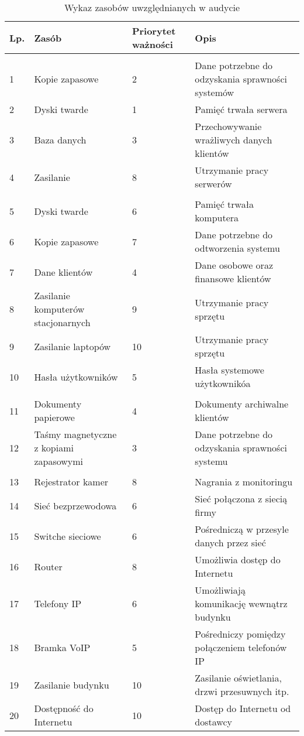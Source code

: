 \begin{longtable}[!ht]{|p{0.5cm}|m{4cm}|m{2cm}|m{6cm}|}
	\caption{Wykaz zasobów uwzględnianych w audycie}
	\label{tab:spis_zasobow}\\
	\hline	
	\rowcolor{lightgray}\textbf{Lp.} & \textbf{Zasób} & \textbf{Priorytet ważności} & \textbf{Opis} \\ \hline
	\rowcolor{lightgray}\multicolumn{4}{|c|}{Serwery:} \\ \hline
	1 & Kopie zapasowe & 2 & Dane potrzebne do odzyskania \linebreak sprawności systemów \\ \hline
	2 & Dyski twarde & 1 & Pamięć trwała serwera \\ \hline
	3 & Baza danych & 3 & Przechowywanie wrażliwych danych klientów \\ \hline
	4 & Zasilanie & 8 & Utrzymanie pracy serwerów \\ \hline
	\rowcolor{lightgray}\multicolumn{4}{|c|}{Komputery pracowników:} \\ \hline	
	5 & Dyski twarde & 6 & Pamięć trwała komputera \\ \hline
	6 & Kopie zapasowe & 7 & Dane potrzebne do odtworzenia \linebreak systemu \\ \hline
	7 & Dane klientów & 4 & Dane osobowe oraz finansowe klientów \\ \hline
	8 & Zasilanie komputerów stacjonarnych & 9 & Utrzymanie pracy sprzętu \\ \hline
	9 & Zasilanie laptopów & 10 &  Utrzymanie pracy sprzętu \\ \hline
	10 & Hasła użytkowników & 5 & Hasła systemowe użytkownikóa \\ \hline
	\rowcolor{lightgray}\multicolumn{4}{|c|}{Archiwum:} \\ \hline
	11 & Dokumenty papierowe & 4 & Dokumenty archiwalne klientów \\	\hline
	12 & Taśmy magnetyczne z kopiami zapasowymi & 3 & Dane potrzebne do odzyskania \linebreak  sprawności systemu \\ \hline
	\rowcolor{lightgray}\multicolumn{4}{|c|}{Inne:} \\ \hline
	13 & Rejestrator kamer & 8 & Nagrania z monitoringu \\ \hline
	14 & Sieć bezprzewodowa & 6 & Sieć połączona z siecią firmy \\ \hline
	15 & Switche sieciowe & 6 & Pośredniczą w przesyle danych przez sieć \\ \hline
	16 & Router & 8 & Umożliwia dostęp do Internetu \\ \hline
	17 & Telefony IP & 6 & Umożliwiają komunikację wewnątrz budynku \\ \hline
	18 & Bramka VoIP & 5 & Pośredniczy pomiędzy połączeniem telefonów IP \\ \hline
	19 & Zasilanie budynku & 10 & Zasilanie oświetlania, drzwi przesuwnych itp. \\ \hline
	20 & Dostępność \linebreak do Internetu & 10 & Dostęp do Internetu od dostawcy \\ \hline 
\end{longtable}

